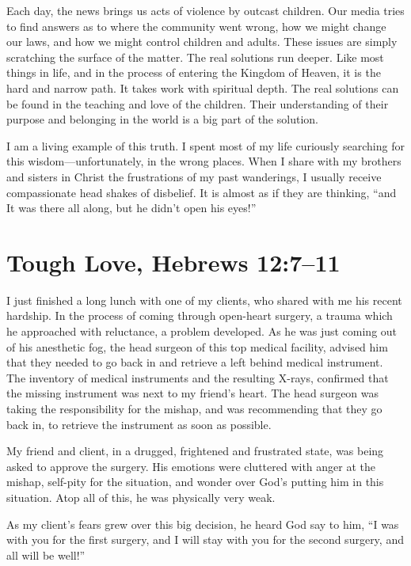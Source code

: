 \documentclass[12pt]{memoir}
\begin{document}
Each day, the news brings us acts of violence by outcast children.
Our media tries to find answers as to where the community went wrong,
how we might change our laws, and how we might control children and
adults. These issues are simply scratching the surface of the matter.
The real solutions run deeper. Like most things in life, and in the
process of entering the Kingdom of Heaven, it is the hard and narrow
path. It takes work with spiritual depth. The real solutions can be
found in the teaching and love of the children. Their understanding
of their purpose and belonging in the world is a big part of the solution.

I am a living example of this truth. I spent most of my life curiously
searching for this wisdom---unfortunately, in the wrong places. When
I share with my brothers and sisters in Christ the frustrations of
my past wanderings, I usually receive compassionate head shakes of
disbelief. It is almost as if they are thinking, ``and It was there
all along, but he didn't open his eyes!''

\section[Tough Love]{Tough Love, Hebrews 12:7--11}

I just finished a long lunch with one of my clients, who shared with
me his recent hardship. In the process of coming through open-heart surgery, a trauma which he approached with reluctance, a problem developed.
As he was just coming out of his anesthetic fog, the head surgeon
of this top medical facility, advised him that they needed to go
back in and retrieve a left behind medical instrument. The
inventory of medical instruments and the resulting X-rays, confirmed
that the missing instrument was next to my friend's heart. The head
surgeon was taking the responsibility for the mishap, and was recommending
that they go back in, to retrieve the instrument as soon as possible.

My friend and client, in a drugged, frightened and frustrated state,
was being asked to approve the surgery. His emotions were cluttered
with anger at the mishap, self-pity for the situation, and wonder
over God's putting him in this situation. Atop all of this, he was
physically very weak.

As my client's fears grew over this big decision, he heard God say
to him, ``I was with you for the first surgery, and I will stay with
you for the second surgery, and all will be well!''
\end{document}
